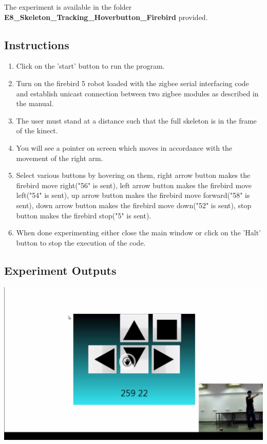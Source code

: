 \begin{flushleft}
\medskip
The experiment is available in the folder \textbf{E8\_Skeleton\_Tracking\_Hoverbutton\_Firebird} provided.
\medskip

\subsection{\textbf{ Instructions}}
\begin{enumerate}
\item Click on the 'start' button to run the program.
\item Turn on the firebird 5 robot loaded with the zigbee serial interfacing code and establish unicast connection between two zigbee modules as described in the manual.
\item The user must stand at a distance such that the full skeleton is in the frame of the kinect.
\item You will see a pointer on screen which moves in accordance with the movement of the right arm.
\item Select various buttons by hovering on them, right arrow button makes the firebird move right("56" is sent), left arrow button makes the firebird move left("54" is sent), up arrow button makes the firebird move forward("58" is sent), down arrow button makes the firebird move down("52" is sent), stop button makes the firebird stop("5" is sent).
\item When done experimenting either close the main window or click on the 'Halt' button to stop the execution of the code.
\end{enumerate}
\medskip
\subsection{\textbf{ Experiment Outputs}}

\includegraphics[scale = 0.5]{e81}


\end{flushleft}
